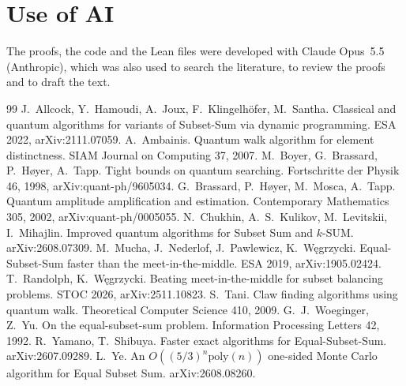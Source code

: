 \documentclass[11pt]{article}
\theoremstyle{remark}
\begin{document}
\section*{Use of AI}

The proofs, the code and the Lean files were developed with Claude Opus~5.5 (Anthropic), which was also used to search the literature, to review the proofs and to draft the text.

\begin{thebibliography}{99}
 J.~Allcock, Y.~Hamoudi, A.~Joux, F.~Klingelh\"ofer, M.~Santha. Classical and quantum algorithms for variants of Subset-Sum via dynamic programming. ESA 2022, arXiv:2111.07059.
 A.~Ambainis. Quantum walk algorithm for element distinctness. SIAM Journal on Computing 37, 2007.
 M.~Boyer, G.~Brassard, P.~H\o yer, A.~Tapp. Tight bounds on quantum searching. Fortschritte der Physik 46, 1998, arXiv:quant-ph/9605034.
 G.~Brassard, P.~H\o yer, M.~Mosca, A.~Tapp. Quantum amplitude amplification and estimation. Contemporary Mathematics 305, 2002, arXiv:quant-ph/0005055.
 N.~Chukhin, A.~S.~Kulikov, M.~Levitskii, I.~Mihajlin. Improved quantum algorithms for Subset Sum and $k$-SUM. arXiv:2608.07309.
 M.~Mucha, J.~Nederlof, J.~Pawlewicz, K.~W\k{e}grzycki. Equal-Subset-Sum faster than the meet-in-the-middle. ESA 2019, arXiv:1905.02424.
 T.~Randolph, K.~W\k{e}grzycki. Beating meet-in-the-middle for subset balancing problems. STOC 2026, arXiv:2511.10823.
 S.~Tani. Claw finding algorithms using quantum walk. Theoretical Computer Science 410, 2009.
 G.~J.~Woeginger, Z.~Yu. On the equal-subset-sum problem. Information Processing Letters 42, 1992.
 R.~Yamano, T.~Shibuya. Faster exact algorithms for Equal-Subset-Sum. arXiv:2607.09289.
 L.~Ye. An $O((5/3)^n\mathrm{poly}(n))$ one-sided Monte Carlo algorithm for Equal Subset Sum. arXiv:2608.08260.
\end{thebibliography}
\end{document}
